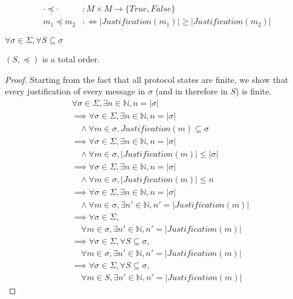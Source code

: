 \begin{defn}[$\preceq$]
\begin{align*}
\cdot \preceq \cdot &: M \times M \to \{True, False\} \\
m_1 \preceq m_2 &:\Leftrightarrow |Justification(m_1)| \geq |Justification(m_2)|
\end{align*}
\end{defn}


\begin{lemma}
$\forall \sigma \in \Sigma, \forall S \subseteq \sigma$

$(S, \preceq)$ is a total order.
\end{lemma}

\begin{proof}
Starting from the fact that all protocol states are finite, we show that every justification of every message in $\sigma$ (and in therefore in $S$) is finite.
\begin{align*}
&\forall \sigma \in \Sigma, \exists n \in \mathbb{N}, n = |\sigma| \\
&\implies \forall \sigma \in \Sigma, \exists n \in \mathbb{N}, n = |\sigma| \\
&~~~~\land \forall m \in \sigma, Justification(m) \subseteq \sigma
\\
&\implies \forall \sigma \in \Sigma, \exists n \in \mathbb{N}, n = |\sigma| \\
&~~~~\land \forall m \in \sigma, |Justification(m)| \leq |\sigma|
\\
&\implies \forall \sigma \in \Sigma, \exists n \in \mathbb{N}, n = |\sigma| \\
&~~~~\land \forall m \in \sigma, |Justification(m)| \leq n
\\
&\implies \forall \sigma \in \Sigma, \exists n \in \mathbb{N}, n = |\sigma| \\
&~~~~\land \forall m \in \sigma, \exists n' \in \mathbb{N}, n' = |Justification(m)|
\\
&\implies \forall \sigma \in \Sigma, \\
&~~~~~\forall m \in \sigma, \exists n' \in \mathbb{N}, n' = |Justification(m)|
\\
&\implies \forall \sigma \in \Sigma, \forall S \subseteq \sigma, \\
&~~~~~\forall m \in \sigma, \exists n' \in \mathbb{N}, n' = |Justification(m)|
\\
&\implies \forall \sigma \in \Sigma, \forall S \subseteq \sigma, \\
&~~~~~\forall m \in S, \exists n' \in \mathbb{N}, n' = |Justification(m)|
\end{align*}


\end{proof}
